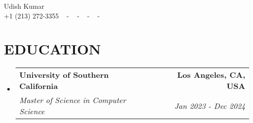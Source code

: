 \documentclass[letterpaper,11pt]{article}
\makeatletter
\newcommand{\resumeSubheading}[4]{
  \vspace{-2pt}\item
    \begin{tabular*}{1.0\textwidth}[t]{l@{\extracolsep{\fill}}r}
      \textbf{\large#1} & \textbf{\small #2} \\
      \textit{\large#3} & \textit{\small #4} \\
      
    \end{tabular*}\vspace{-7pt}
}
\newcommand{\resumeSubHeadingListStart}{\begin{itemize}[leftmargin=0.0in, label={}]}
\newcommand{\resumeSubHeadingListEnd}{\end{itemize}}
\makeatother
\begin{document}


\begin{center}
    {\huge Udish Kumar} \\ \vspace{2pt} 
    {+1 (213) 272-3355} ~ 
    \small{-}
    \href{https://github.com/udishkumar}{\color{blue}{Portfolio}} ~ 
    \small{-}
    \href{mailto:udishkum@usc.edu}{\color{blue}{udishkum@usc.edu}} ~ 
    \small{-}
    \href{https://linkedin.com/in/iudishkumar}{ \color{blue}{linkedin.com/in/iudishkumar}}  ~
    \small{-}
    \href{https://github.com/udishkumar}{ \color{blue}{github.com/udishkumar}} ~
    \vspace{-7pt}
\end{center}

\section{\color{airforceblue}EDUCATION}
  \resumeSubHeadingListStart
    \resumeSubheading
      {University of Southern California}{Los Angeles, CA, USA}
      {Master of Science in Computer Science}{Jan 2023 - Dec 2024}
    \vspace{-4pt}
  \resumeSubHeadingListEnd
  \vspace{-10pt}

\end{document}
